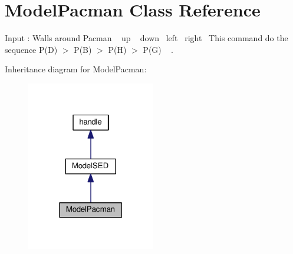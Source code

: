\hypertarget{class_model_pacman}{}\section{Model\+Pacman Class Reference}
\label{class_model_pacman}


Input \+: Walls around Pacman ~ up ~ down~ left~ right~\newline
This command do the sequence P(\+D) $>$ P(\+B) $>$ P(\+H) $>$ P(\+G) ~\newline
.  




Inheritance diagram for Model\+Pacman\+:\nopagebreak
\begin{figure}[H]
\begin{center}
\leavevmode
\includegraphics[width=159pt]{class_model_pacman__inherit__graph}
\end{center}
\end{figure}
